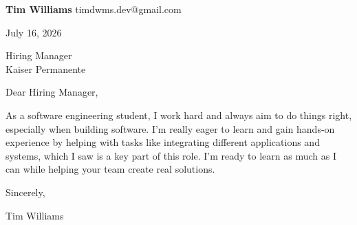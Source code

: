 \documentclass[12pt]{article}
\begin{document}
\textbf{Tim Williams} \hfill timdwms.dev@gmail.com

\vspace{1em}

July 16, 2026

\vspace{1em}

Hiring Manager \\
Kaiser Permanente

\vspace{1em}

Dear Hiring Manager,

As a software engineering student, I work hard and always aim to do things right, especially when building software. I'm really eager to learn and gain hands-on experience by helping with tasks like integrating different applications and systems, which I saw is a key part of this role. I'm ready to learn as much as I can while helping your team create real solutions.

\vspace{1em}

Sincerely,

\vspace{2em}

Tim Williams
\end{document}

